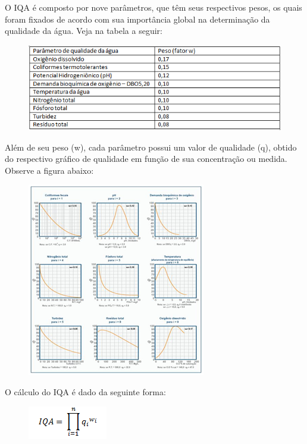 \documentclass[12pt,openright,oneside,a4paper,brazil]{abntex2}
\begin{document}
O IQA é composto por nove parâmetros, que têm seus respectivos pesos, os quais foram fixados de acordo com sua importância global na determinação da qualidade da água. Veja na tabela a seguir:
\begin{figure}[h]
\centering
\includegraphics[scale=0.8]{tabela}
\end{figure}
\FloatBarrier
Além de seu peso (w), cada parâmetro possui um valor de qualidade (q), obtido do respectivo gráfico de qualidade em função de sua concentração ou medida. Observe a figura abaixo:
\begin{figure}[h]
\centering
\includegraphics[scale=0.8]{grafico}
\end{figure}
\FloatBarrier

O cálculo do IQA é dado da seguinte forma:

\begin{figure}[h]
\centering
\includegraphics[scale=1]{eq1}
\end{figure}
\end{document}
